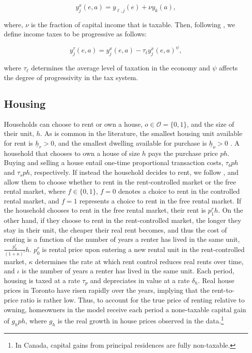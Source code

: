 \documentclass[parskip=full]{article}
\begin{document}
\begin{equation*}\label{eq:taxable_labor_income}
  y^{x}_{j}(e,a) =y_{\ell,j}(e)+\nu y_{k}(a),
\end{equation*}

\noindent where, $\nu$ is the fraction of capital income that is taxable. Then, following \citet{hsv-2020}, we define income taxes to be progressive as follows:

\begin{equation}\label{eq:income_tax}
  y^{\tau}_{j}(e,a) = y^{x}_{j}(e,a)-\tau_{\ell}y^{x}_{j}(e,a)^{\psi},
\end{equation}

\noindent where $\tau_{\ell}$ determines the average level of taxation in the economy and $\psi$ affects the degree of progressivity in the tax system.

\subsection{Housing}\label{subsection:housing_choice}

Households can choose to rent or own a house, $o \in \mathcal{O}=\{0,1\}$, and the size of their unit, $h$. As is common in the literature, the smallest housing unit available for rent is $\underline{h}_{r}>0$, and the smallest dwelling available for purchase is $\underline{h}_{o}>0$ \citep{gervais,sommeretal-2013,sommersullivan-2017,kaplanetal-2019}. A household that chooses to own a house of size $h$ pays the purchase price $p h$. Buying and selling a house entail one-time proportional transaction costs, $\tau_{b} p h$ and $\tau_{s} p h$, respectively. If instead the household decides to rent, we follow \citet{fallis-1985}, and allow them to choose whether to rent in the rent-controlled market or the free rental market, where $f \in \{0,1\}$, $f=0$ denotes a choice to rent in the controlled rental market, and $f=1$ represents a choice to rent in the free rental market. If the household chooses to rent in the free rental market, their rent is $p^{r}_{1}h$. On the other hand, if they choose to rent in the rent-controlled market, the longer they stay in their unit, the cheaper their real rent becomes, and thus the cost of renting is a function of the number of years a renter has lived in the same unit, $\frac{p^{r}_{0}}{(1+\kappa)^{\iota}} h$. $p^{r}_{0}$ is rental price upon entering a new rental unit in the rent-controlled market, $\kappa$ determines the rate at which rent control reduces real rents over time, and $\iota$ is the number of years a renter has lived in the same unit. Each period, housing is taxed at a rate $\tau_{p}$ and depreciates in value at a rate $\delta_h$. Real house prices in Toronto have risen rapidly over the years, implying that the rent-to-price ratio is rather low. Thus, to account for the true price of renting relative to owning, homeowners in the model receive each period a none-taxable capital gain of $g_{h}ph$, where $g_{h}$ is the real growth in house prices observed in the data.\footnote{In Canada, capital gains from principal residences are fully non-taxable.}
\end{document}
